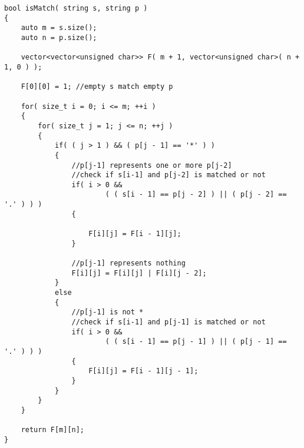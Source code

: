 \begin{lstlisting}[style=customc, caption={Dynamic Programming}]
bool isMatch( string s, string p )
{
    auto m = s.size();
    auto n = p.size();

    vector<vector<unsigned char>> F( m + 1, vector<unsigned char>( n + 1, 0 ) );

    F[0][0] = 1; //empty s match empty p

    for( size_t i = 0; i <= m; ++i )
    {
        for( size_t j = 1; j <= n; ++j )
        {
            if( ( j > 1 ) && ( p[j - 1] == '*' ) )
            {
                //p[j-1] represents one or more p[j-2]
                //check if s[i-1] and p[j-2] is matched or not
                if( i > 0 &&
                        ( ( s[i - 1] == p[j - 2] ) || ( p[j - 2] == '.' ) ) )
                {

                    F[i][j] = F[i - 1][j];
                }

                //p[j-1] represents nothing
                F[i][j] = F[i][j] | F[i][j - 2];
            }
            else
            {
                //p[j-1] is not *
                //check if s[i-1] and p[j-1] is matched or not
                if( i > 0 &&
                        ( ( s[i - 1] == p[j - 1] ) || ( p[j - 1] == '.' ) ) )
                {
                    F[i][j] = F[i - 1][j - 1];
                }
            }
        }
    }

    return F[m][n];
}

\end{lstlisting}